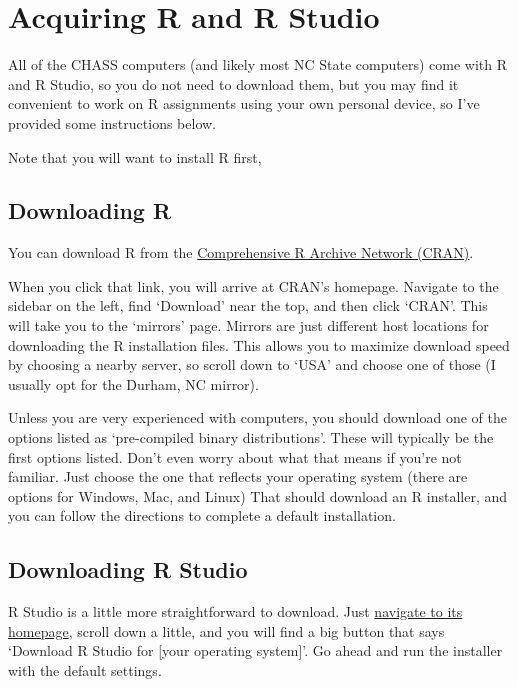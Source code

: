 \documentclass[
  letterpaper,
  DIV=11,
  numbers=noendperiod]{scrreprt}
\begin{document}
\section*{Acquiring R and R Studio}\label{acquiring-r-and-r-studio}


All of the CHASS computers (and likely most NC State computers) come
with R and R Studio, so you do not need to download them, but you may
find it convenient to work on R assignments using your own personal
device, so I've provided some instructions below.

Note that you will want to install R first,

\subsection*{Downloading R}\label{downloading-r}

You can download R from the
\href{https://www.r-project.org/}{Comprehensive R Archive Network
(CRAN)}.

When you click that link, you will arrive at CRAN's homepage. Navigate
to the sidebar on the left, find `Download' near the top, and then click
`CRAN'. This will take you to the `mirrors' page. Mirrors are just
different host locations for downloading the R installation files. This
allows you to maximize download speed by choosing a nearby server, so
scroll down to `USA' and choose one of those (I usually opt for the
Durham, NC mirror).

Unless you are very experienced with computers, you should download one
of the options listed as `pre-compiled binary distributions'. These will
typically be the first options listed. Don't even worry about what that
means if you're not familiar. Just choose the one that reflects your
operating system (there are options for Windows, Mac, and Linux) That
should download an R installer, and you can follow the directions to
complete a default installation.

\subsection*{Downloading R Studio}\label{downloading-r-studio}

R Studio is a little more straightforward to download. Just
\href{https://posit.co/download/rstudio-desktop/}{navigate to its
homepage}, scroll down a little, and you will find a big button that
says `Download R Studio for {[}your operating system{]}'. Go ahead and
run the installer with the default settings.
\end{document}
